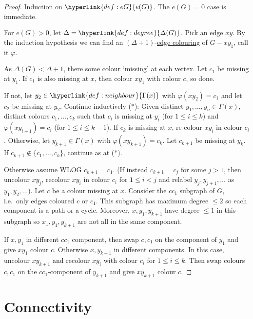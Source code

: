 \documentclass{article}
\begin{document}
\begin{proof}
    Induction on $\hyperlink{def:eG}{e(G)}$. The $e(G) = 0$ case is immediate.

    For $e(G) > 0$, let $\Delta = \hyperlink{def:degree}{\Delta(G)}$. Pick an edge $xy$.
    By the induction hypothesis we can find an $(\Delta+1)$-\hyperlink{def:eColour}{edge colouring} of $G - x y_1$, call it $\varphi$.

    As $\Delta(G) < \Delta + 1$, there some colour `missing' at each vertex.
    Let $c_1$ be missing at $y_1$. If $c_1$ is also missing at $x$, then colour $xy_1$ with colour $c$, so done.

    If not, let $y_2 \in \hyperlink{def:neighbour}{\Gamma(x)}$ with $\varphi(x y_2) = c_1$ and let $c_2$ be missing at $y_2$.
    Continue inductively ($*$):
    Given distinct $y_1, \dotsc, y_n \in \Gamma(x)$, distinct colours $c_1, \dotsc, c_k$ such that $c_i$ is missing at $y_i$ (for $1 \leq i \leq k$) and $\varphi(x y_{i+1}) = c_i$ (for $1 \leq i \leq k-1$).
    If $c_k$ is missing at $x$, re-colour $xy_i$ in colour $c_i$.
    Otherwise, let $y_{k+1} \in \Gamma(x)$ with $\varphi(x y_{k+1}) = c_k$.
    Let $c_{k+1}$ be missing at $y_k$. If $c_{k+1} \notin \{c_1, \dotsc, c_k\}$, continue as at ($*$).

    Otherwise assume WLOG $c_{k+1} = c_1$. (If instead $c_{k+1} = c_j$ for some $j > 1$, then uncolour $xy_j$, recolour $x y_i$ in colour $c_i$ for $1 \leq i < j$ and relabel $y_j, y_{j+1}, \dotsc$ as $y_1, y_2, \dotsc$).
    Let $c$ be a colour missing at $x$.
    Consider the $cc_1$ subgraph of $G$, i.e.\ only edges coloured $c$ or $c_1$.
    This subgraph has maximum degree $\leq 2$ so each component is a path or a cycle.
    Moreover, $x,y_1,y_{k+1}$ have degree $\leq 1$ in this subgraph so $x_1, y_1, y_{k+1}$ are not all in the same component.

    If $x,y_1$ in different $c c_1$ component, then swap $c,c_1$ on the component of $y_1$ and give $x y_1$ colour $c$.
    Otherwise $x, y_{k+1}$ in different components. In this case, uncolour $x y_{k+1}$ and recolour $x y_i$ with colour $c_i$ for $1 \leq i \leq k$.
    Then swap colours $c,c_1$ on the $c c_1$-component of $y_{k+1}$ and give $x y_{k+1}$ colour $c$.
\end{proof}

\clearpage
\section{Connectivity}
\end{document}
